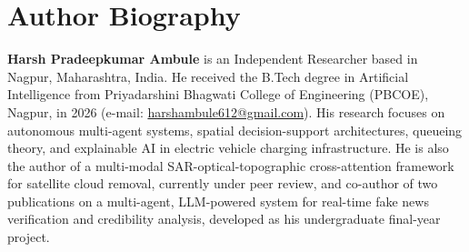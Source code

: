 \documentclass[preprint,12pt,authoryear]{elsarticle}
\begin{document}
\section*{Author Biography}
\noindent\textbf{Harsh Pradeepkumar Ambule} is an Independent Researcher based in Nagpur, Maharashtra, India. He received the B.Tech degree in Artificial Intelligence from Priyadarshini Bhagwati College of Engineering (PBCOE), Nagpur, in 2026 (e-mail: \href{mailto:harshambule612@gmail.com}{harshambule612@gmail.com}). His research focuses on autonomous multi-agent systems, spatial decision-support architectures, queueing theory, and explainable AI in electric vehicle charging infrastructure. He is also the author of a multi-modal SAR-optical-topographic cross-attention framework for satellite cloud removal, currently under peer review, and co-author of two publications on a multi-agent, LLM-powered system for real-time fake news verification and credibility analysis, developed as his undergraduate final-year project.



\end{document}
